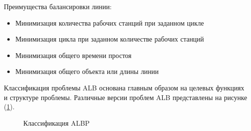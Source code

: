 Преимущества балансировки линии:

\begin{itemize}
    \item Минимизация количества рабочих станций при заданном цикле
    \item Минимизация цикла при заданном количестве рабочих станций
    \item Минимизация общего времени простоя
    \item Минимизация общего объекта или длины линии
\end{itemize}

Классификация проблемы ALB основана главным образом на целевых функциях и структуре проблемы. Различные версии проблем ALB представлены на рисунке (\ref{ris:image1}).

\begin{figure}[H]
    \caption{Классификация ALBP}
    \label{ris:image1}
\end{figure}

